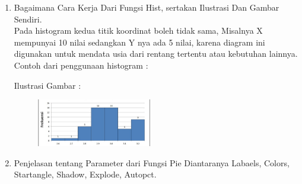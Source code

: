 \begin{enumerate}
\item Bagaimana Cara Kerja Dari Fungsi Hist, sertakan Ilustrasi Dan Gambar Sendiri.\\

Pada histogram kedua titik koordinat boleh tidak sama, Misalnya X mempunyai 10 nilai sedangkan Y nya ada 5 nilai, 
karena diagram ini digunakan untuk mendata usia dari rentang tertentu atau kebutuhan lainnya.
Contoh dari penggunaan histogram :


Ilustrasi Gambar :
	\begin{figure}[ht!]
	\includegraphics[width=5cm]{figures/6/1174062/histogram.png}
	\centering
	\end{figure}


\item Penjelasan tentang Parameter dari Fungsi Pie Diantaranya Labaels, Colors, Startangle, Shadow, Explode, Autopct.


\end{enumerate}
